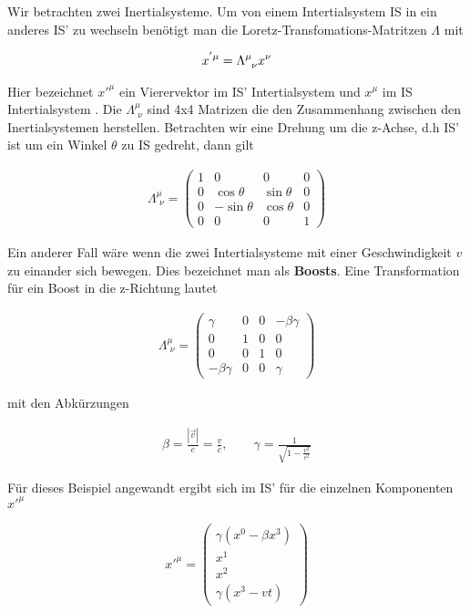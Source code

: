 Wir betrachten zwei Inertialsysteme. Um von einem Intertialsystem IS in ein anderes IS' zu wechseln benötigt man die Loretz-Transfomations-Matritzen \(\Lambda\) mit

\begin{align}
  \label{eq:11}
  x^{'\mu}=\Lambda^\mu_{\hphantom\mu \nu}x^\nu
\end{align}

Hier bezeichnet \(x'^\mu\) ein Vierervektor im IS' Intertialsystem und \(x^\mu\) im IS Intertialsystem . Die \(\Lambda^\mu_{\,\, \nu}\) sind 4x4 Matrizen die den Zusammenhang zwischen den Inertialsystemen herstellen. Betrachten wir eine Drehung um die z-Achse, d.h IS' ist um ein Winkel \(\theta\) zu IS gedreht, dann gilt

\begin{align}
  \label{eq:12}
  \Lambda^\mu_{\,\, \nu} =
  \begin{pmatrix}
    1&0&0&0\\
0&\cos\theta&\sin\theta&0\\
0&-\sin\theta&\cos\theta&0\\
    0&0&0&1
  \end{pmatrix}
\end{align}

Ein anderer Fall wäre wenn die zwei Intertialsysteme mit einer Geschwindigkeit \(v\) zu einander sich bewegen. Dies bezeichnet man als \textbf{Boosts}. Eine Transformation für ein Boost in die z-Richtung lautet

\begin{align}
  \label{eq:13}
  \Lambda^\mu_{\,\, \nu} =
  \begin{pmatrix}
    \gamma&0&0&-\beta\gamma\\
0&1&0&0\\
0&0&1&0\\
    -\beta\gamma&0&0&\gamma
  \end{pmatrix}
\end{align}

mit den Abkürzungen

\begin{align}
  \label{eq:14}
  \beta =\frac{|\vec v|}{c}= \frac{v}{c} ,\qquad \gamma = \frac{1}{\sqrt{1-\frac{v^2}{c^2}}}
\end{align}


Für dieses Beispiel angewandt ergibt sich im IS' für die einzelnen Komponenten \(x'^\mu\)

\begin{align}
  \label{eq:15}
  x'^\mu =
  \begin{pmatrix}
     \gamma(x^0-\beta x^3)\\
     x^1\\
     x^2\\
 \gamma(x^3-vt)
  \end{pmatrix}
\end{align}

